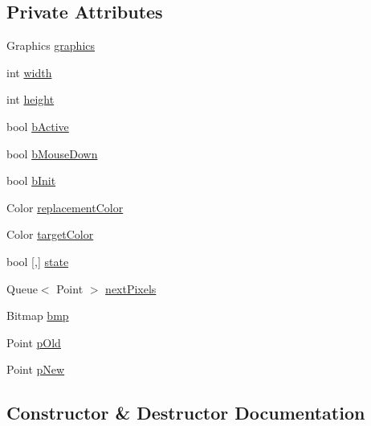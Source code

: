 \subsection*{Private Attributes}
\begin{DoxyCompactItemize}
\item 
Graphics \mbox{\hyperlink{class_paint___program_1_1_paint_bucket_tool_ad4796532e0545dc68c4b3778178fad2e}{graphics}}
\item 
int \mbox{\hyperlink{class_paint___program_1_1_paint_bucket_tool_a6ce97164dafbd6d9a1d4635fc82a38cc}{width}}
\item 
int \mbox{\hyperlink{class_paint___program_1_1_paint_bucket_tool_a89e7d4f153c36b7bf279b705640fb78f}{height}}
\item 
bool \mbox{\hyperlink{class_paint___program_1_1_paint_bucket_tool_ad8cc7cec1295221aee3a52dc3b312f34}{b\+Active}}
\item 
bool \mbox{\hyperlink{class_paint___program_1_1_paint_bucket_tool_a00761193f37c2e0382165672e493af00}{b\+Mouse\+Down}}
\item 
bool \mbox{\hyperlink{class_paint___program_1_1_paint_bucket_tool_a6ff1fa675a5f72c14ade90dd2801c5d9}{b\+Init}}
\item 
Color \mbox{\hyperlink{class_paint___program_1_1_paint_bucket_tool_a16cb2c9c001579a26ac268d554d02e75}{replacement\+Color}}
\item 
Color \mbox{\hyperlink{class_paint___program_1_1_paint_bucket_tool_a6da72588a1c155a76996068c39845461}{target\+Color}}
\item 
bool \mbox{[},\mbox{]} \mbox{\hyperlink{class_paint___program_1_1_paint_bucket_tool_ab5a8f482b6852b3be693351091c1eacf}{state}}
\item 
Queue$<$ Point $>$ \mbox{\hyperlink{class_paint___program_1_1_paint_bucket_tool_a148eb4478aee2136004a96ee6e12d13d}{next\+Pixels}}
\item 
Bitmap \mbox{\hyperlink{class_paint___program_1_1_paint_bucket_tool_ae9bff45d3adf430284c98b7c257389dd}{bmp}}
\item 
Point \mbox{\hyperlink{class_paint___program_1_1_paint_bucket_tool_a746b9e892e792bac61e5ec69e4278ccb}{p\+Old}}
\item 
Point \mbox{\hyperlink{class_paint___program_1_1_paint_bucket_tool_a3d7d0b56d4adea1702b912f0d8258527}{p\+New}}
\end{DoxyCompactItemize}


\subsection{Constructor \& Destructor Documentation}
\mbox{\label{class_paint___program_1_1_paint_bucket_tool_acff0d603cffb8e2b068e5ab74a63c9bd}} 
